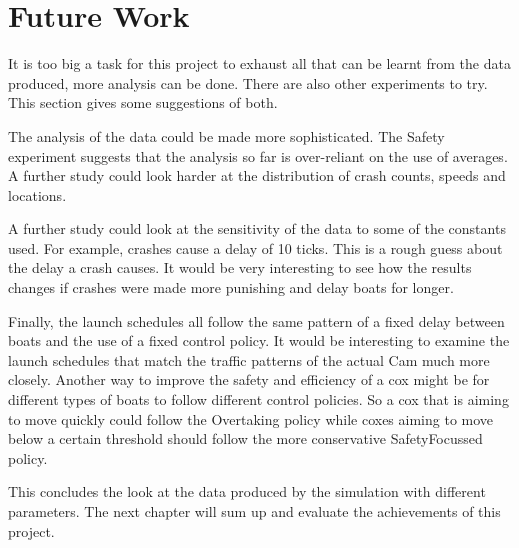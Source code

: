 \section{Future Work}
It is too big a task for this project to exhaust all that can be learnt from the data produced, more analysis can be done. There are also other experiments to try. This section gives some suggestions of both.

The analysis of the data could be made more sophisticated. The Safety experiment suggests that the analysis so far is over-reliant on the use of averages. A further study could look harder at the distribution of crash counts, speeds and locations.

A further study could look at the sensitivity of the data to some of the constants used. For example, crashes cause a delay of 10 ticks. This is a rough guess about the delay a crash causes. It would be very interesting to see how the results changes if crashes were made more punishing and delay boats for longer.

Finally, the launch schedules all follow the same pattern of a fixed delay between boats and the use of a fixed control policy. It would be interesting to examine the launch schedules that match the traffic patterns of the actual Cam much more closely. Another way to improve the safety and efficiency of a cox might be for different types of boats to follow different control policies. So a cox that is aiming to move quickly could follow the Overtaking policy while coxes aiming to move below a certain threshold should follow the more conservative SafetyFocussed policy.

This concludes the look at the data produced by the simulation with different parameters. The next chapter will sum up and evaluate the achievements of this project.